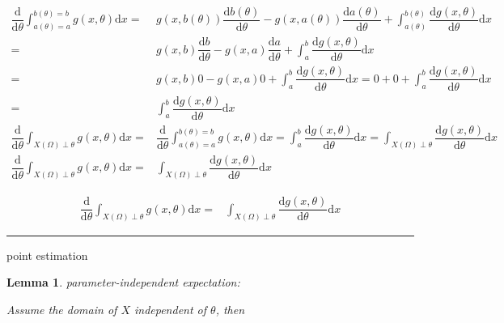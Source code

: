 \documentclass[
]{book}
\newtheorem{lemma}{Lemma}[chapter]
\theoremstyle{definition}
\theoremstyle{definition}
\theoremstyle{definition}
\theoremstyle{definition}
\theoremstyle{remark}
\begin{document}
\[
\begin{aligned}
\dfrac{\mathrm{d}}{\mathrm{d}\theta}\int_{a\left(\theta\right)=a}^{b\left(\theta\right)=b}g\left(x,\theta\right)\mathrm{d}x= & g\left(x,b\left(\theta\right)\right)\dfrac{\mathrm{d}b\left(\theta\right)}{\mathrm{d}\theta}-g\left(x,a\left(\theta\right)\right)\dfrac{\mathrm{d}a\left(\theta\right)}{\mathrm{d}\theta}+\int_{a\left(\theta\right)}^{b\left(\theta\right)}\dfrac{\mathrm{d}g\left(x,\theta\right)}{\mathrm{d}\theta}\mathrm{d}x\\
= & g\left(x,b\right)\dfrac{\mathrm{d}b}{\mathrm{d}\theta}-g\left(x,a\right)\dfrac{\mathrm{d}a}{\mathrm{d}\theta}+\int_{a}^{b}\dfrac{\mathrm{d}g\left(x,\theta\right)}{\mathrm{d}\theta}\mathrm{d}x\\
= & g\left(x,b\right)0-g\left(x,a\right)0+\int_{a}^{b}\dfrac{\mathrm{d}g\left(x,\theta\right)}{\mathrm{d}\theta}\mathrm{d}x=0+0+\int_{a}^{b}\dfrac{\mathrm{d}g\left(x,\theta\right)}{\mathrm{d}\theta}\mathrm{d}x\\
= & \int_{a}^{b}\dfrac{\mathrm{d}g\left(x,\theta\right)}{\mathrm{d}\theta}\mathrm{d}x\\
\dfrac{\mathrm{d}}{\mathrm{d}\theta}\int_{X\left(\Omega\right)\perp\theta}g\left(x,\theta\right)\mathrm{d}x= & \dfrac{\mathrm{d}}{\mathrm{d}\theta}\int_{a\left(\theta\right)=a}^{b\left(\theta\right)=b}g\left(x,\theta\right)\mathrm{d}x=\int_{a}^{b}\dfrac{\mathrm{d}g\left(x,\theta\right)}{\mathrm{d}\theta}\mathrm{d}x=\int_{X\left(\Omega\right)\perp\theta}\dfrac{\mathrm{d}g\left(x,\theta\right)}{\mathrm{d}\theta}\mathrm{d}x\\
\dfrac{\mathrm{d}}{\mathrm{d}\theta}\int_{X\left(\Omega\right)\perp\theta}g\left(x,\theta\right)\mathrm{d}x= & \int_{X\left(\Omega\right)\perp\theta}\dfrac{\mathrm{d}g\left(x,\theta\right)}{\mathrm{d}\theta}\mathrm{d}x
\end{aligned}
\]

\[
\begin{aligned}
\dfrac{\mathrm{d}}{\mathrm{d}\theta}\int_{X\left(\Omega\right)\perp\theta}g\left(x,\theta\right)\mathrm{d}x=&\int_{X\left(\Omega\right)\perp\theta}\dfrac{\mathrm{d}g\left(x,\theta\right)}{\mathrm{d}\theta}\mathrm{d}x
\end{aligned}
\]

\begin{center}\rule{0.5\linewidth}{0.5pt}\end{center}

point estimation

\begin{lemma}
\protect\hypertarget{lem:unnamed-chunk-36}{}\label{lem:unnamed-chunk-36}parameter-independent expectation:

Assume the domain of \(X\) independent of \(\theta\), then
\end{lemma}
\end{document}
